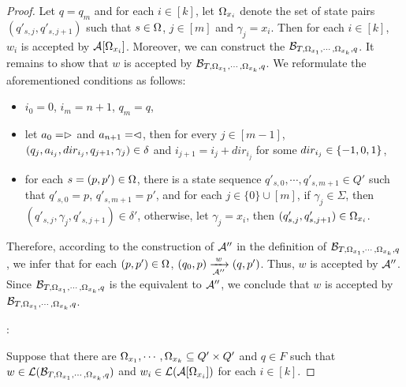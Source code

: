 \begin{proof}
Let $q = q_m$ and for each $i \in [k]$, let $\Omega_{x_i}$ denote the set of state pairs $(q'_{s, j}, q'_{s, j+1})$ such that $s \in \Omega$, $j \in [m]$ and $\gamma_j  = x_i$. 
Then for each $i \in [k]$, $w_i$ is accepted by $\mathcal{A}[\Omega_{x_i}]$.  Moreover, we can construct the \FFA{} $\mathcal{B}_{T, \Omega_{x_1}, \cdots, \Omega_{x_k}, q}$.
It remains to show that $w$ is accepted by $\mathcal{B}_{T, \Omega_{x_1}, \cdots, \Omega_{x_k}, q}$. 
We reformulate the aforementioned conditions as follows: 
%
\begin{itemize}
\item $i_0=0$, $i_m = n+1$, $q_m = q$,
%
\item let $a_0 = \vartriangleright$ and $a_{n+1} = \vartriangleleft$,  then for every $j \in [m-1]$, $(q_j, a_{i_j}, dir_{i_j}, q_{j+1}, \gamma_j) \in
        \delta$ and $i_{j+1} = i_j + dir_{i_j}$ for some $dir_{i_j} \in \{-1, 0, 1\}$, 
 \item  for each $s=(p, p') \in \Omega$, there is a state sequence $q'_{s, 0}, \cdots, q'_{s,m+1} \in Q'$ such that $q'_{s,0}= p$, $q'_{s, m+1} = p'$, and 
 for each $j \in \{0\} \cup [m]$, if $\gamma_j \in \Sigma$, then $(q'_{s, j}, \gamma_j, q'_{s, j+1}) \in \delta'$, otherwise, let $\gamma_j =x_i$, then $(q'_{s, j}, q'_{s, j+1}) \in \Omega_{x_i}$.  
\end{itemize}
Therefore, according to the construction of $\mathcal{A}''$ in the definition of $\mathcal{B}_{T, \Omega_{x_1}, \cdots, \Omega_{x_k}, q}$, we infer that
for each $(p, p') \in \Omega$, $(q_0, p) \xrightarrow[\mathcal{A}'']{w} (q, p')$. Thus, $w$ is accepted by $\mathcal{A}''$. Since  $\mathcal{B}_{T, \Omega_{x_1}, \cdots, \Omega_{x_k}, q}$ is the \FFA{} equivalent to $\mathcal{A}''$, we conclude that $w$ is accepted by $\mathcal{B}_{T, \Omega_{x_1}, \cdots, \Omega_{x_k}, q}$.


\smallskip

: 

\smallskip

Suppose that there are $\Omega_{x_1},\cdots, \Omega_{x_k} \subseteq Q' \times Q'$ and $q \in F$ such that $w \in \mathcal{L}(\mathcal{B}_{T, \Omega_{x_1}, \cdots, \Omega_{x_k}, q})$ and $w_i \in \mathcal{L}(\mathcal{A}[\Omega_{x_i}])$ for each $i \in [k]$. 


\end{proof}
